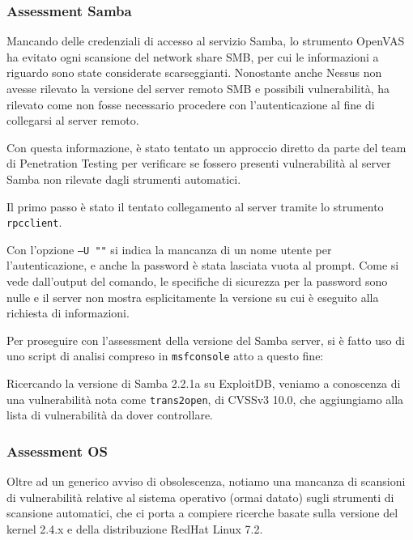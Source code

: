 \documentclass[12pt, a4paper]{article}
\begin{document}
	\subsubsection{Assessment Samba}
	Mancando delle credenziali di accesso al servizio Samba, lo strumento OpenVAS ha evitato ogni scansione del network share SMB, per cui le informazioni a riguardo sono state considerate scarseggianti. Nonostante anche Nessus non avesse rilevato la versione del server remoto SMB e possibili vulnerabilità, ha rilevato come non fosse necessario procedere con l'autenticazione al fine di collegarsi al server remoto.
	
	Con questa informazione, è stato tentato un approccio diretto da parte del team di Penetration Testing per verificare se fossero presenti vulnerabilità al server Samba non rilevate dagli strumenti automatici.
	
	Il primo passo è stato il tentato collegamento al server tramite lo strumento \texttt{rpcclient}\cite{samba}.
	
	
	\newpage
	Con l'opzione \texttt{--U ""} si indica la mancanza di un nome utente per l'autenticazione, e anche la password è stata lasciata vuota al prompt. Come si vede dall'output del comando, le specifiche di sicurezza per la password sono nulle e il server non mostra esplicitamente la versione su cui è eseguito alla richiesta di informazioni.
	
	Per proseguire con l'assessment della versione del Samba server, si è fatto uso di uno script di analisi compreso in \texttt{msfconsole}\cite{metasploit} atto a questo fine:
	
	
	Ricercando la versione di Samba 2.2.1a su ExploitDB\cite{exploitdb}, veniamo a conoscenza di una vulnerabilità nota come \texttt{trans2open}, di CVSSv3 10.0, che aggiungiamo alla lista di vulnerabilità da dover controllare.
	
	\subsubsection{Assessment OS}
	Oltre ad un generico avviso di obsolescenza, notiamo una mancanza di scansioni di vulnerabilità relative al sistema operativo (ormai datato) sugli strumenti di scansione automatici, che ci porta a compiere ricerche basate sulla versione del kernel 2.4.x e della distribuzione RedHat Linux 7.2.
	
\end{document}
